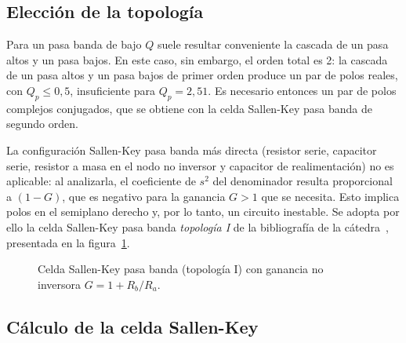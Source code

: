 \subsection{Elección de la topología}
\label{subsec:pbd-topologia}

Para un pasa banda de bajo $Q$ suele resultar conveniente la cascada de un pasa altos y un pasa bajos. En este caso,
sin embargo, el orden total es 2: la cascada de un pasa altos y un pasa bajos de primer orden produce un par de polos
reales, con $Q_p \le 0{,}5$, insuficiente para $Q_p = 2{,}51$. Es necesario entonces un par de polos complejos
conjugados, que se obtiene con la celda Sallen-Key pasa banda de segundo orden.

La configuración Sallen-Key pasa banda más directa (resistor serie, capacitor serie, resistor a masa en el nodo no
inversor y capacitor de realimentación) no es aplicable: al analizarla, el coeficiente de $s^2$ del denominador
resulta proporcional a $(1 - G)$, que es negativo para la ganancia $G > 1$ que se necesita. Esto implica polos en el
semiplano derecho y, por lo tanto, un circuito inestable. Se adopta por ello la celda Sallen-Key pasa banda
\emph{topología I} de la bibliografía de la cátedra~\cite{barbero2024}, presentada en la figura~\ref{crkt:pbd-sk}.

\begin{figure}[H]
  \centering
  
  \caption{Celda Sallen-Key pasa banda (topología I) con ganancia no inversora $G = 1 + R_b / R_a$.}
  \label{crkt:pbd-sk}
\end{figure}

\subsection{Cálculo de la celda Sallen-Key}
\label{subsec:pbd-celda}

